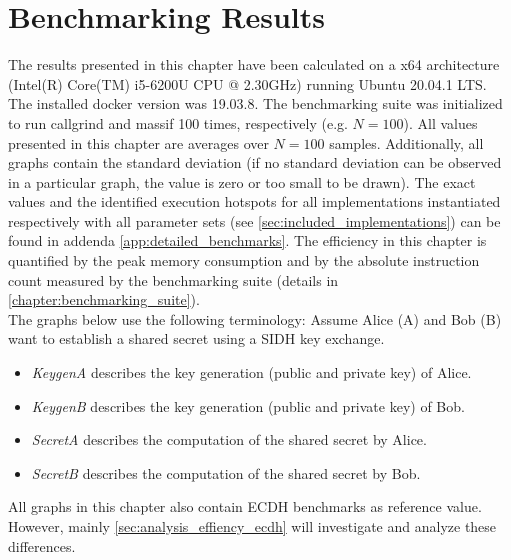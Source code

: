 \chapter{Benchmarking Results}\label{chapter:analysis}

The results presented in this chapter have been calculated on a x64 architecture (Intel(R) Core(TM) i5-6200U CPU @ 2.30GHz) running Ubuntu 20.04.1 LTS. The installed docker version was 19.03.8. The benchmarking suite was initialized to run callgrind and massif 100 times, respectively (e.g. $N=100$). All values presented in this chapter are averages over $N=100$ samples. Additionally, all graphs contain the standard deviation (if no standard deviation can be observed in a particular graph, the value is zero or too small to be drawn). The exact values and the identified execution hotspots for all implementations instantiated respectively with all parameter sets (see \autoref{sec:included_implementations}) can be found in addenda \ref{app:detailed_benchmarks}. The efficiency in this chapter is quantified by the peak memory consumption and by the absolute instruction count measured by the benchmarking suite (details in \autoref{chapter:benchmarking_suite}). \\
The graphs below use the following terminology:
Assume Alice (A) and Bob (B) want to establish a shared secret using a \gls{SIDH} key exchange.
\begin{itemize}
\item \textit{KeygenA} describes the key generation (public and private key) of Alice.
\item \textit{KeygenB} describes the key generation (public and private key) of Bob.
\item \textit{SecretA} describes the computation of the shared secret by Alice.
\item \textit{SecretB} describes the computation of the shared secret by Bob.
\end{itemize}
All graphs in this chapter also contain \gls{ECDH} benchmarks as reference value. However, mainly \autoref{sec:analysis_effiency_ecdh} will investigate and analyze these differences.\\

